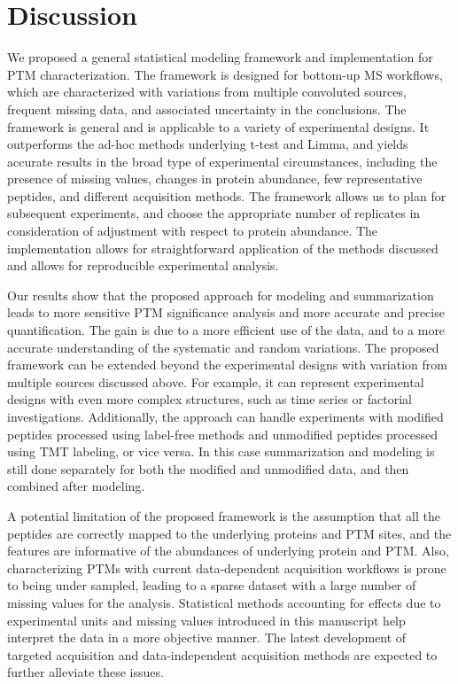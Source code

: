 \documentclass[mcp]{article}
\numberwithin{table}{section}
\begin{document}
\section{Discussion}

We proposed a general statistical modeling framework and implementation for PTM characterization. The framework is designed for bottom-up MS workflows, which are characterized with variations from multiple convoluted sources, frequent missing data, and associated uncertainty in the conclusions. The framework is general and is applicable to a variety of experimental designs. It outperforms the ad-hoc methods underlying t-test and Limma, and yields accurate results in the broad type of experimental circumstances, including the presence of missing values, changes in protein abundance, few representative peptides, and different acquisition methods. The framework allows us to plan for subsequent experiments, and choose the appropriate number of replicates in consideration of adjustment with respect to protein abundance. The implementation allows for straightforward application of the methods discussed and allows for reproducible experimental analysis.

Our results show that the proposed approach for modeling and summarization  leads to more sensitive PTM significance analysis and more accurate and precise quantification. The gain is due to a more efficient use of the data, and to a more accurate understanding of the systematic and random variations. The proposed framework can be extended beyond the experimental designs with variation from multiple sources discussed above. For example, it can represent experimental designs with even more complex structures, such as time series or factorial investigations. Additionally, the approach can handle experiments with modified peptides processed using label-free methods and unmodified peptides processed using TMT labeling, or vice versa. In this case summarization and modeling is still done separately for both the modified and unmodified data, and then combined after modeling.

A potential limitation of the proposed framework is the assumption that all the peptides are correctly mapped to the underlying proteins and PTM sites, and the features are informative of the abundances of underlying protein and PTM. Also, characterizing PTMs with current data-dependent acquisition workflows is prone to being under sampled, leading to a sparse dataset with a large number of missing values for the analysis. Statistical methods accounting for effects due to experimental units and missing values introduced in this manuscript help interpret the data in a more objective manner. The latest development of targeted acquisition and data-independent acquisition methods are expected to further alleviate these issues. 
\end{document}
